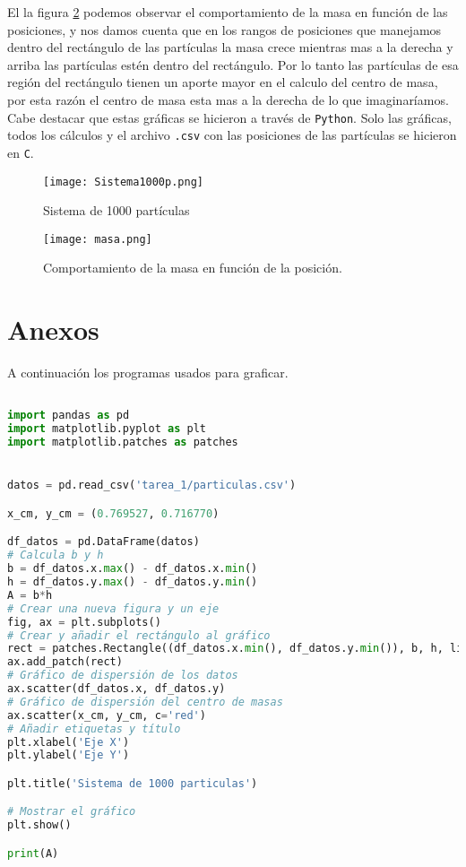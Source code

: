 \documentclass[12pt]{article}
\begin{document}
El la figura \ref{fig:masa} podemos observar el comportamiento de la masa en función de las posiciones, y nos damos cuenta que en los rangos de posiciones que manejamos dentro del rectángulo de las partículas la masa crece mientras mas a la derecha y arriba las partículas estén dentro del rectángulo. Por lo tanto las partículas de esa región del rectángulo tienen un aporte mayor en el calculo del centro de masa, por esta razón el centro de masa esta mas a la derecha de lo que imaginaríamos.  \\

Cabe destacar que estas gráficas se hicieron a través de \verb|Python|. Solo las gráficas, todos los cálculos y el archivo \verb|.csv| con las posiciones de las partículas se hicieron en \verb|C|.

\begin{figure}[h!]
    \centering
    \texttt{[image: Sistema1000p.png]}
    \caption{Sistema de 1000 partículas}
    \label{fig:1000particulas}
\end{figure}


\begin{figure}[h!]
    \centering
    \texttt{[image: masa.png]}
    \caption{Comportamiento de la masa en función de la posición.}
    \label{fig:masa}
\end{figure}

\newpage


\section{Anexos}


A continuación los programas usados para graficar.

\begin{lstlisting}[language=Python, caption={Graficador de particulas.}, style=mystyle]

import pandas as pd 
import matplotlib.pyplot as plt  
import matplotlib.patches as patches


datos = pd.read_csv('tarea_1/particulas.csv')

x_cm, y_cm = (0.769527, 0.716770)

df_datos = pd.DataFrame(datos)
# Calcula b y h
b = df_datos.x.max() - df_datos.x.min() 
h = df_datos.y.max() - df_datos.y.min()
A = b*h
# Crear una nueva figura y un eje 
fig, ax = plt.subplots() 
# Crear y añadir el rectángulo al gráfico 
rect = patches.Rectangle((df_datos.x.min(), df_datos.y.min()), b, h, linewidth=3, edgecolor='r', facecolor='none') 
ax.add_patch(rect) 
# Gráfico de dispersión de los datos 
ax.scatter(df_datos.x, df_datos.y) 
# Gráfico de dispersión del centro de masas 
ax.scatter(x_cm, y_cm, c='red') 
# Añadir etiquetas y título 
plt.xlabel('Eje X') 
plt.ylabel('Eje Y')

plt.title('Sistema de 1000 particulas') 

# Mostrar el gráfico 
plt.show()

print(A)
\end{lstlisting}
\end{document}
